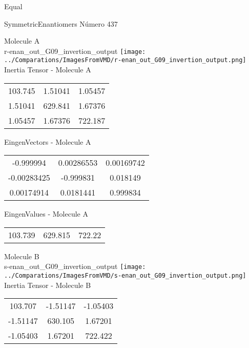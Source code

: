 \begin{center}
\vtab
\vtab
\textcolor{NavyBlue}{\Large Equal}
\end{center}

 \newpage

\vtab[-2cm]
\begin{center}
{\large SymmetricEnantiomers \tab Número 437}
\end{center}
\begin{multicols}{2}
\begin{center}

Molecule A \\ 
r-enan\_out\_G09\_invertion\_output
\texttt{[image: ../Comparations/ImagesFromVMD/r-enan\_out\_G09\_invertion\_output.png]}
\\
Inertia Tensor - Molecule A \\
\vtab

\begin{tabular}{|c c c|}
103.745	 & 	1.51041	 & 	1.05457	 \\
1.51041	 & 	629.841	 & 	1.67376	 \\
1.05457	 & 	1.67376	 & 	722.187
\end{tabular}

\vtab
 EingenVectors - Molecule A     \\
\vtab
\begin{tabular}{|c c c|}
-0.999994	 & 	0.00286553	 & 	0.00169742	 \\
-0.00283425	 & 	-0.999831	 & 	0.018149	 \\
0.00174914	 & 	0.0181441	 & 	0.999834
\end{tabular}

\vtab
 EingenValues - Molecule A     \\
\vtab
\begin{tabular}{|c c c|}
103.739	 & 	629.815	 & 	722.22	 \\
\end{tabular}
\columnbreak

Molecule B \\ 
s-enan\_out\_G09\_invertion\_output
\texttt{[image: ../Comparations/ImagesFromVMD/s-enan\_out\_G09\_invertion\_output.png]}
\\
Inertia Tensor - Molecule B \\
\vtab

\begin{tabular}{|c c c|}
103.707	 & 	-1.51147	 & 	-1.05403	 \\
-1.51147	 & 	630.105	 & 	1.67201	 \\
-1.05403	 & 	1.67201	 & 	722.422
\end{tabular}


\end{center}
\end{multicols}

